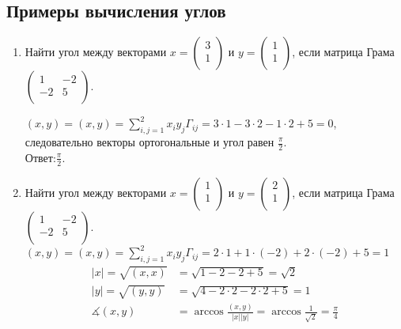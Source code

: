 \documentclass[12pt]{article}
\begin{document}
\subsection{Примеры вычисления углов}
\begin{enumerate}
    \item Найти угол между векторами $x = \begin{pmatrix}
                  3 \\
                  1 \\
              \end{pmatrix}$ и $y= \begin{pmatrix}
                  1 \\
                  1 \\
              \end{pmatrix}$, если матрица Грама $\begin{pmatrix}
                  1  & -2 \\
                  -2 & 5  \\
              \end{pmatrix}$.

          $(x,y)=(x,y)=\sum\limits_{i,j=1}^2 x_iy_j\Gamma_{ij} = 3\cdot1 - 3\cdot2-1\cdot2+5=0$, следовательно векторы ортогональные и угол равен $\frac{\pi}{2}$.\\

          Ответ:$\frac{\pi}{2}$.\\
    \item Найти угол между векторами $x = \begin{pmatrix}
                  1 \\
                  1 \\
              \end{pmatrix}$ и $y= \begin{pmatrix}
                  2 \\
                  1 \\
              \end{pmatrix}$, если матрица Грама $\begin{pmatrix}
                  1  & -2 \\
                  -2 & 5  \\
              \end{pmatrix}$.\\
          $(x,y)=(x,y)=\sum\limits_{i,j=1}^2 x_iy_j\Gamma_{ij} = 2\cdot1 + 1\cdot(-2)+2\cdot(-2)+5=1$\\
          \begin{equation*}
              \begin{aligned}
                  |x|=\sqrt{(x,x)}    & =\sqrt{1-2-2+5}=\sqrt{2}                                               \\
                  |y|=\sqrt{(y,y)}    & =\sqrt{4-2\cdot2-2\cdot2+5}=1                                          \\
                  \measuredangle(x,y) & =\arccos \frac{(x,y)}{|x||y|}=\arccos \frac{1}{\sqrt{2}}=\frac{\pi}{4} \\
              \end{aligned}
          \end{equation*}


\end{enumerate}
\end{document}
